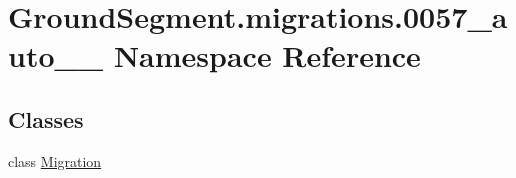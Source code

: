 \hypertarget{namespace_ground_segment_1_1migrations_1_10057__auto__20170327__1907}{}\section{Ground\+Segment.\+migrations.0057\+\_\+auto\+\_\+\_ Namespace Reference}
\label{namespace_ground_segment_1_1migrations_1_10057__auto__20170327__1907}
\subsection*{Classes}
\begin{DoxyCompactItemize}
\item 
class \hyperlink{class_ground_segment_1_1migrations_1_10057__auto__20170327__1907_1_1_migration}{Migration}
\end{DoxyCompactItemize}
